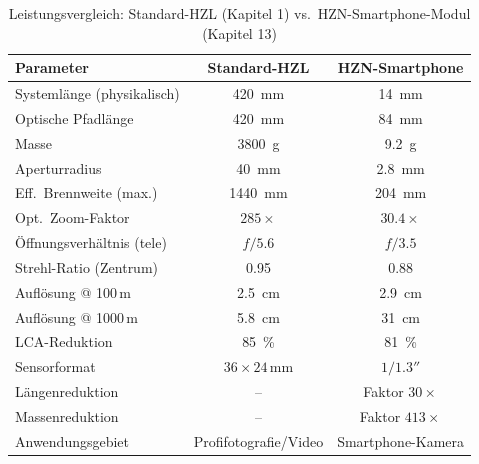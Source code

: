 ﻿\documentclass[12pt,a4paper]{article}
\theoremstyle{definition}
\begin{document}
	\begin{table}[H]
		\centering
		\caption{Leistungsvergleich: Standard-HZL (Kapitel 1)
			vs.\ HZN-Smartphone-Modul (Kapitel 13)}
		\label{tab:comparison}
		\begin{tabular}{lcc}
			\toprule
			\textbf{Parameter} & \textbf{Standard-HZL} & \textbf{HZN-Smartphone}\\
			\midrule
			\rowcolor{blue!8}
			Systeml\"ange (physikalisch)  & \SI{420}{\milli\metre}     & \SI{14}{\milli\metre}    \\
			Optische Pfadl\"ange          & \SI{420}{\milli\metre}     & \SI{84}{\milli\metre}    \\
			\rowcolor{blue!8}
			Masse                         & \SI{3800}{\gram}           & \SI{9.2}{\gram}          \\
			Aperturradius                 & \SI{40}{\milli\metre}      & \SI{2.8}{\milli\metre}   \\
			\rowcolor{blue!8}
			Eff.\ Brennweite (max.)       & \SI{1440}{\milli\metre}    & \SI{204}{\milli\metre}   \\
			Opt.\ Zoom-Faktor             & $285\times$                & $30.4\times$             \\
			\rowcolor{blue!8}
			\"Offnungsverh\"altnis (tele) & $f/5.6$                    & $f/3.5$                  \\
			Strehl-Ratio (Zentrum)        & 0.95                       & 0.88                     \\
			\rowcolor{blue!8}
			Aufl\"osung @ 100\,m         & \SI{2.5}{\centi\metre}     & \SI{2.9}{\centi\metre}   \\
			Aufl\"osung @ 1000\,m        & \SI{5.8}{\centi\metre}     & \SI{31}{\centi\metre}    \\
			\rowcolor{blue!8}
			LCA-Reduktion                 & \SI{85}{\percent}          & \SI{81}{\percent}        \\
			Sensorformat                  & $36\times24$\,mm           & $1/1.3''$                \\
			\rowcolor{blue!8}
			L\"angenreduktion             & --                         & Faktor $30\times$        \\
			Massenreduktion               & --                         & Faktor $413\times$       \\
			\rowcolor{blue!8}
			Anwendungsgebiet              & Profifotografie/Video      & Smartphone-Kamera        \\
			\bottomrule
		\end{tabular}
	\end{table}
\end{document}
